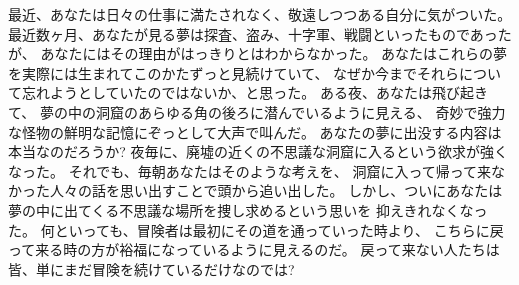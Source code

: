 最近、あなたは日々の仕事に満たされなく、敬遠しつつある自分に気がついた。
最近数ヶ月、あなたが見る夢は探査、盗み、十字軍、戦闘といったものであったが、
あなたにはその理由がはっきりとはわからなかった。
あなたはこれらの夢を実際には生まれてこのかたずっと見続けていて、
なぜか今までそれらについて忘れようとしていたのではないか、と思った。
ある夜、あなたは飛び起きて、
夢の中の洞窟のあらゆる角の後ろに潜んでいるように見える、
奇妙で強力な怪物の鮮明な記憶にぞっとして大声で叫んだ。
あなたの夢に出没する内容は本当なのだろうか?
夜毎に、廃墟の近くの不思議な洞窟に入るという欲求が強くなった。
それでも、毎朝あなたはそのような考えを、
洞窟に入って帰って来なかった人々の話を思い出すことで頭から追い出した。
しかし、ついにあなたは夢の中に出てくる不思議な場所を捜し求めるという思いを
抑えきれなくなった。
何といっても、冒険者は最初にその道を通っていった時より、
こちらに戻って来る時の方が裕福になっているように見えるのだ。
戻って来ない人たちは皆、単にまだ冒険を続けているだけなのでは?

